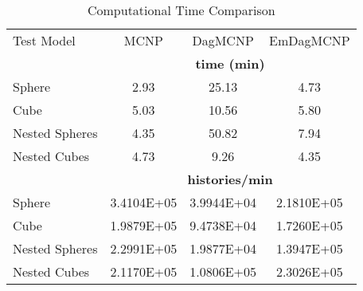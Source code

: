 \documentclass{anstrans}
\begin{document}
\begin{table}
  \small
  \begin{center}

      \caption{Computational Time Comparison}
      \label{timings}
    \begin{tabular}{lccc}



      \toprule
      Test Model & MCNP & DagMCNP & EmDagMCNP \\
      & \multicolumn{3}{c}{\textbf{time (min)}} \\
      \hline
      Sphere & 2.93 & 25.13 & 4.73  \\
      Cube & 5.03 & 10.56  & 5.80 \\
      Nested Spheres & 4.35 & 50.82 & 7.94 \\
      Nested Cubes & 4.73 & 9.26 & 4.35 \\
      &  \multicolumn{3}{c}{\textbf{histories/min}} \\
      \hline
      Sphere & 3.4104E+05  & 3.9944E+04  & 2.1810E+05   \\
      Cube & 1.9879E+05 & 9.4738E+04 & 1.7260E+05 \\
      Nested Spheres & 2.2991E+05 & 1.9877E+04 & 1.3947E+05 \\
      Nested Cubes & 2.1170E+05 & 1.0806E+05 & 2.3026E+05 \\
      \bottomrule
      
    \end{tabular}
  \end{center}
\end{table}



\end{document}
